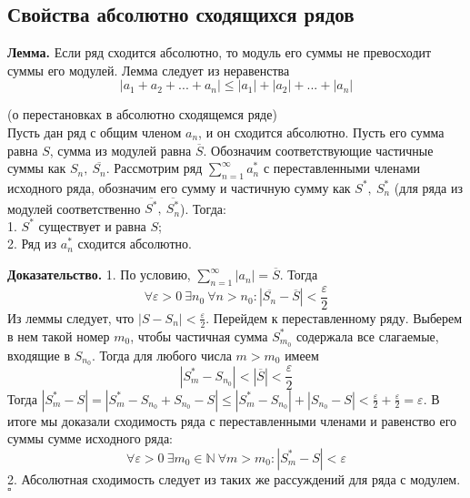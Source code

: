 \subsection{Свойства абсолютно сходящихся рядов}
\textbf{Лемма.} Если ряд сходится абсолютно, то модуль его суммы не 
превосходит суммы его модулей. Лемма следует из неравенства
$$\left| a_1+a_2+...+a_n \right|\leqslant |a_1|+|a_2|+...+|a_n|$$
\begin{theor} (о перестановках в абсолютно сходящемся ряде)\\
    Пусть дан ряд с общим членом $a_n$, и он сходится абсолютно.
    Пусть его сумма равна $S$, сумма из модулей равна $\overline{S}$. 
    Обозначим соответствующие частичные суммы как $S_n,~\overline{S_n}$.
    Рассмотрим ряд $\sum\limits_{n=1}^{\infty} a^*_n$ с переставленными
    членами исходного ряда, обозначим его сумму
    и частичную сумму как $S^*,~S^*_n$ (для ряда из модулей соответственно
    $\overline{S^*},~\overline{S^*_n}$). Тогда:\\
    1. $S^*$ существует и равна  $S$;\\
    2. Ряд из  $a^*_n$ сходится абсолютно.
    \end{theor}
\textbf{Доказательство.} 1.  
По условию, $\sum\limits_{n=1}^{\infty} |a_n|=\overline{S}$. Тогда
$$\forall \varepsilon>0~\exists n_0~\forall n>n_0:|\overline{S_n}-
\overline{S}|<\frac{\varepsilon}{2}$$ 
Из леммы следует, что $|S-S_n|<\frac{\varepsilon}{2}$. 
Перейдем к переставленному ряду. Выберем в нем такой номер $m_0$, 
чтобы частичная сумма $S^*_{m_0}$ содержала все слагаемые, входящие в 
$S_{n_0}$. Тогда для любого числа $m>m_0$ имеем
$$|S^*_{m}-S_{n_0}|<|\overline{S}|<\frac{\varepsilon}{2}$$
Тогда $|S^*_m-S|=|S^*_m-S_{n_0}+S_{n_0}-S|\leqslant 
|S^*_m-S_{n_0}|+|S_{n_0}-S|<\frac{\varepsilon}{2}+\frac{\varepsilon}{2}=
\varepsilon$. 
В итоге мы доказали сходимость ряда с переставленными членами и равенство 
его суммы сумме исходного ряда:
$$\forall \varepsilon>0~\exists m_0\in\mathbb{N}~\forall m>m_0:|S^*_m-S|
<\varepsilon$$ 
2. Абсолютная сходимость следует из таких же рассуждений для ряда с модулем. 
$\square$ 
